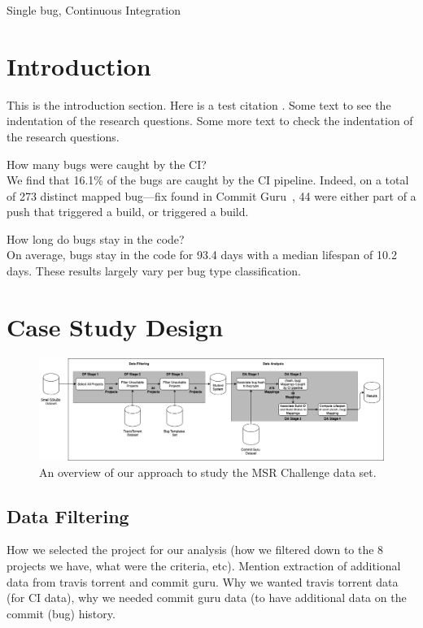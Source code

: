 \documentclass[10pt,conference]{IEEEtran}
\begin{document}
\begin{IEEEkeywords}
	Single bug, Continuous Integration
\end{IEEEkeywords}


\section{Introduction}
This is the introduction section. Here is a test citation \cite{abdalkareem_2020_a}. Some text to see the indentation of the research questions. Some more text to check the indentation of the research questions.
\begin{questions}
    \item How many bugs were caught by the CI? \\ We find that 16.1\% of the bugs are caught by the CI pipeline. Indeed, on a total of 273 distinct mapped bug---fix found in Commit Guru~\cite{RosenFSE2015}, 44 were either part of a push that triggered a build, or triggered a build. 
\end{questions}
\begin{questions}[resume]
    \item How long do bugs stay in the code? \\ On average, bugs stay in the code for 93.4 days with a median lifespan of 10.2 days. These results largely vary per bug type classification.  
\end{questions}

\section{Case Study Design}
\begin{figure}[t]
\centering
\includegraphics[width=\linewidth]{process.png}
\caption{An overview of our approach to study the MSR Challenge data set.}
\label{fig:process}
\end{figure}

\subsection{Data Filtering}
How we selected the project for our analysis (how we filtered down to the 8 projects we have, what were the criteria, etc). Mention extraction of additional data from travis torrent and commit guru. Why we wanted travis torrent data (for CI data), why we needed commit guru data (to have additional data on the commit (bug) history.
\end{document}
